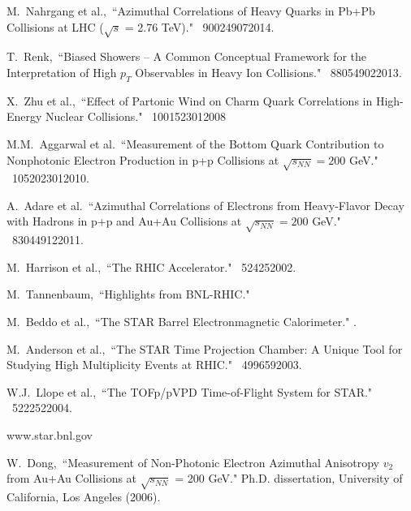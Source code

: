 \begin{thebibliography}{1000}
M.~Nahrgang et al.,~``Azimuthal Correlations of Heavy Quarks in Pb+Pb Collisions at LHC ($\sqrt{s}$ = 2.76 TeV)." \Journal{\PRC} {~90}{024907}{2014}.

T.~Renk,~``Biased Showers -- A Common Conceptual Framework for the Interpretation of High $p_T$ Observables in Heavy Ion Collisions." \Journal{\PRC} {~88}{054902}{2013}.

X.~Zhu et al.,~``Effect of Partonic Wind on Charm Quark Correlations in High-Energy Nuclear Collisions." \Journal{\PRL} {~100}{152301}{2008}

M.M.~Aggarwal et al.~``Measurement of the Bottom Quark Contribution to Nonphotonic Electron Production in p+p Collisions at $\sqrt{s_{NN}} = 200$ GeV." \Journal{\PRL} {~105}{202301}{2010}.

A.~Adare et al.~``Azimuthal Correlations of Electrons from Heavy-Flavor Decay with Hadrons in p+p and Au+Au Collisions at $\sqrt{s_{NN}} = 200$ GeV." \Journal{\PRC} {~83}{044912}{2011}.


M.~Harrison et al.,~``The RHIC Accelerator." \Journal{\ARNPS} {~52}{425}{2002}.

M.~Tannenbaum,~``Highlights from BNL-RHIC." 

M.~Beddo et al.,~``The STAR Barrel Electronmagnetic Calorimeter." .

M.~Anderson et al.,~``The STAR Time Projection Chamber: A Unique Tool for Studying High Multiplicity Events at RHIC." \Journal{\NIM } {~499}{659}{2003}.

W.J.~Llope et al.,~``The TOFp/pVPD Time-of-Flight System for STAR." \Journal{\NIM} {~522}{252}{2004}.

www.star.bnl.gov

W.~Dong,~``Measurement of Non-Photonic Electron Azimuthal Anisotropy $v_2$ from Au+Au Collisions at $\sqrt{s_{NN}}$ = 200 GeV." Ph.D. dissertation, University of California, Los Angeles (2006).


\end{thebibliography}
